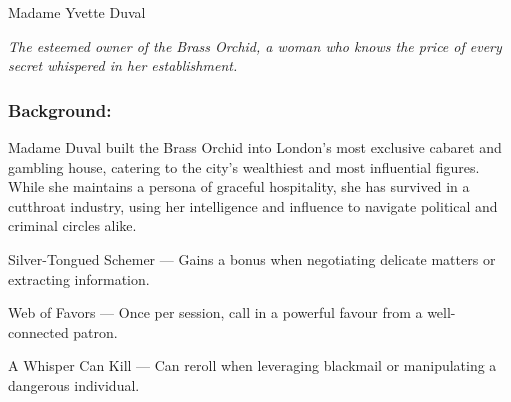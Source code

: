 \begin{WyrdFullNPC}[%
    name=Madame Yvette Duval,%
    description=The Brass Orchid’s Matron,%
    float=!t%
  ]{Madame Yvette Duval}
  
    \emph{The esteemed owner of the Brass Orchid, a woman who knows the price of every secret whispered in her establishment.}
  
    \subsubsection*{Background:}
    Madame Duval built the Brass Orchid into London’s most exclusive cabaret and gambling house, catering to the city’s wealthiest and most influential figures. While she maintains a persona of graceful hospitality, she has survived in a cutthroat industry, using her intelligence and influence to navigate political and criminal circles alike.
  
    \vspace{0.5\baselineskip}
    \SkillsBox[%
      expert={Persuasion},%
      skilled={Deception, Resources},%
      novice={Awareness, Etiquette, Insight}%
    ]
  
    \begin{TraitsBox}
      \item[Silver-Tongued Schemer] — Gains a bonus when negotiating delicate matters or extracting information.
      \item[Web of Favors] — Once per session, call in a powerful favour from a well-connected patron.
      \item[A Whisper Can Kill] — Can reroll when leveraging blackmail or manipulating a dangerous individual.
    \end{TraitsBox}
  
  \end{WyrdFullNPC}
  